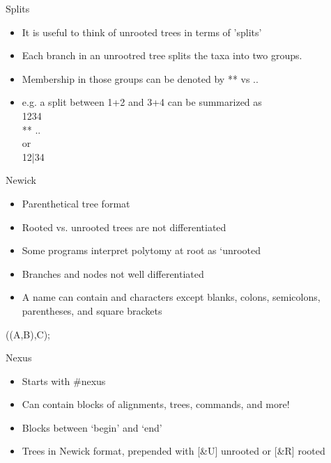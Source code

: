 \documentclass{beamer}
\begin{document}
\begin{frame}
Splits\\
\begin{itemize}
 \item It is useful to think of unrooted trees in terms of 'splits'
 \item Each branch in an unrootred tree splits the taxa into two groups.
 \item Membership in those groups can be denoted by ** vs .. 
 \item e.g. a split between 1+2 and 3+4 can be summarized as\\
 1234\\ 
 ** ..\\
  or\\
12|34
\end{itemize}
\end{frame}








\begin{frame}
Newick\\
\begin{itemize}
 \item Parenthetical tree format
 \item Rooted vs. unrooted trees are not differentiated
 \item Some programs interpret polytomy at root as `unrooted
 \item Branches and nodes not well differentiated
 \item A name can contain and characters except blanks, colons, semicolons, parentheses, and square brackets
\end{itemize}
((A,B),C);
\end{frame}

\begin{frame}
Nexus\\
\begin{itemize}
 \item Starts with \#nexus
 \item Can contain blocks of alignments, trees, commands, and more!
 \item Blocks between `begin' and `end'
 \item Trees in Newick format, prepended with [\&U] unrooted or [\&R] rooted
\end{itemize}
\end{frame}
\end{document}
